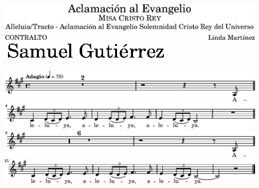 \includegraphics{16/lily-5c5edf0a-1}%
\ifx\betweenLilyPondSystem \undefined
  \linebreak
\else
  \expandafter{}%
\fi
\includegraphics{16/lily-5c5edf0a-2}%
\ifx\betweenLilyPondSystem \undefined
  \linebreak
\else
  \expandafter{}%
\fi
\includegraphics{16/lily-5c5edf0a-3}%
\ifx\betweenLilyPondSystem \undefined
  \linebreak
\else
  \expandafter{}%
\fi
\includegraphics{16/lily-5c5edf0a-4}%
\ifx\betweenLilyPondSystem \undefined
  \linebreak
\else
  \expandafter{}%
\fi
\includegraphics{16/lily-5c5edf0a-5}%
\ifx\betweenLilyPondSystem \undefined
  \linebreak
\else
  \expandafter{}%
\fi
\includegraphics{16/lily-5c5edf0a-6}%
\ifx\betweenLilyPondSystem \undefined
  \linebreak
\else
  \expandafter{}%
\fi
\includegraphics{16/lily-5c5edf0a-7}%
\ifx\betweenLilyPondSystem \undefined
  \linebreak
\else
  \expandafter{}%
\fi
\includegraphics{16/lily-5c5edf0a-8}%
